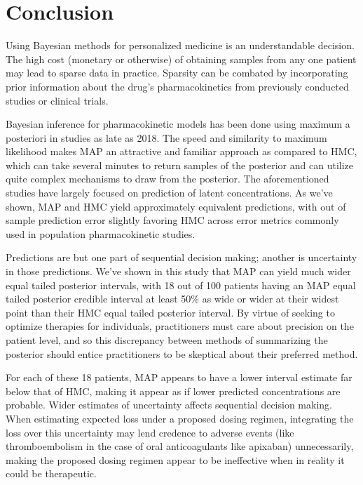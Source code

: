 \section{Conclusion}

Using Bayesian methods for personalized medicine is an understandable decision.  The high cost (monetary or otherwise) of obtaining samples from any one patient may lead to sparse data in practice.  Sparsity can be combated by incorporating prior information about the drug’s pharmacokinetics from previously conducted studies or clinical trials.

Bayesian inference for pharmacokinetic models has been done using maximum a posteriori in studies as late as 2018.  The speed and similarity to maximum likelihood makes MAP an attractive and familiar approach as compared to HMC, which can take several minutes to return samples of the posterior and can utilize quite complex mechanisms to draw from the posterior. The aforementioned studies have largely focused on prediction of latent concentrations.  As we’ve shown, MAP and HMC yield approximately equivalent predictions, with out of sample prediction error slightly favoring HMC across error metrics commonly used in population pharmacokinetic studies. 

Predictions are but one part of sequential decision making; another is uncertainty in those predictions.  We’ve shown in this study that MAP can yield much wider equal tailed posterior intervals, with 18 out of 100 patients having an MAP equal tailed posterior credible interval at least 50\% as wide or wider at their widest point than their HMC equal tailed posterior interval.  By virtue of seeking to optimize therapies for individuals, practitioners must care about precision on the patient level, and so this discrepancy between  methods of summarizing the posterior should entice practitioners to be skeptical about their preferred method.

For each of these 18 patients, MAP appears to have a lower interval estimate far below that of HMC, making it appear as if lower predicted concentrations are probable. Wider estimates of uncertainty affects sequential decision making.  When estimating expected loss under a proposed dosing regimen, integrating the loss over this uncertainty may lend credence to adverse events (like thromboembolism in the case of oral anticoagulants like apixaban) unnecessarily, making the proposed dosing regimen appear to be ineffective when in reality it could be therapeutic. 

